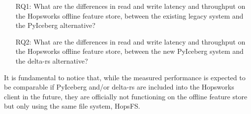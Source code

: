 \begin{enumerate}
    \item[RQ1:] What are the differences in read and write latency and throughput on the Hopsworks offline feature store, between the existing legacy system and the PyIceberg alternative?
    \item[RQ2:] What are the differences in read and write latency and throughput on the Hopsworks offline feature store, between the new PyIceberg system and the delta-rs alternative?
\end{enumerate}

It is fundamental to notice that, while the measured performance is expected to be comparable if PyIceberg and/or delta-rs are included into the Hopsworks client in the future, they are officially not functioning on the offline feature store but only using the same file system, \gls{HopsFS}.